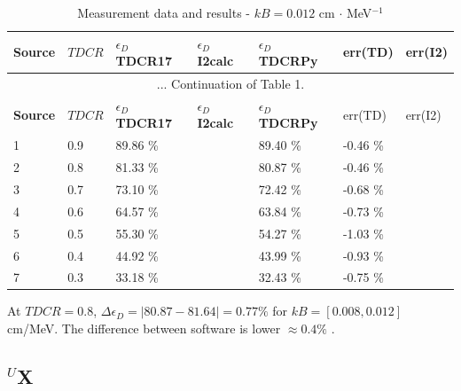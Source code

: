 \documentclass[12pt]{iopart}
\begin{document}
\begingroup
\footnotesize
\begin{longtable}[l]{| p{} | p{} |p{} |p{} |p{} |p{} |p{} |} 
\caption{Measurement data and results - $kB = 0.012$ cm $\cdot$ MeV$^{-1}$}
\label{Table1} \\ 
\hline
\textbf{Source} & \textbf{$TDCR$} & \textbf{$\epsilon_{D}$ TDCR17} & \textbf{$\epsilon_{D}$ I2calc} & \textbf{$\epsilon_{D}$ TDCRPy} & err(TD)& err(I2) \\ 
\endfirsthead
\multicolumn{7}{c}{... Continuation of Table 1.}\\ 
\hline
 \textbf{Source} & \textbf{$TDCR$} & \textbf{$\epsilon_{D}$ TDCR17} & \textbf{$\epsilon_{D}$ I2calc} & \textbf{$\epsilon_{D}$ TDCRPy} & err(TD)& err(I2) \\   \hline 
\endhead
\hline
 1 & 0.9   &   89.86 \% &  & 89.40 \% &  -0.46 \% & \\
 2 & 0.8   &   81.33 \% &  & 80.87 \% &  -0.46 \% & \\
 3 & 0.7   &   73.10 \% &  & 72.42 \% &  -0.68 \% & \\
 4 & 0.6   &   64.57 \% &  & 63.84 \% &  -0.73 \% & \\
 5 & 0.5   &   55.30 \% &  & 54.27 \% &  -1.03 \% & \\
 6 & 0.4   &   44.92 \% &  & 43.99 \% &  -0.93 \% & \\
 7 & 0.3   &   33.18 \% &  & 32.43 \% &  -0.75 \% & \\
\hline
\end{longtable} 
\endgroup

At $TDCR = 0.8$, $\Delta \epsilon_D = |80.87 - 81.64| = 0.77 \%$ for $kB = [0.008, 0.012]$ cm/MeV. The difference between software is lower $\approx 0.4 \%$ . 


\pagebreak
\subsection{$^{U}$X}
\end{document}

